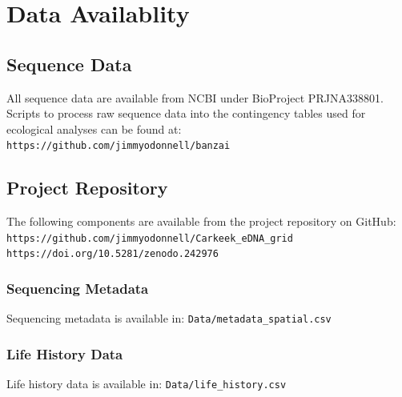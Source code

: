 \documentclass[11pt,letterpaper]{article} %
\begin{document}

\section*{Data Availablity}
\label{data}

\subsection*{Sequence Data}
\label{sequence_data}
All sequence data are available from NCBI under BioProject PRJNA338801.\\
Scripts to process raw sequence data into the contingency tables used for ecological analyses can be found at: \\
\verb!https://github.com/jimmyodonnell/banzai!\\

\subsection*{Project Repository}
The following components are available from the project repository on GitHub: \\
\verb!https://github.com/jimmyodonnell/Carkeek_eDNA_grid!\\
\verb!https://doi.org/10.5281/zenodo.242976!

\subsubsection*{Sequencing Metadata}
\label{sequencing_metadata}
Sequencing metadata is available in: \verb!Data/metadata_spatial.csv!

\subsubsection*{Life History Data}
\label{life_history_data}
Life history data is available in: \verb!Data/life_history.csv!
\end{document}
